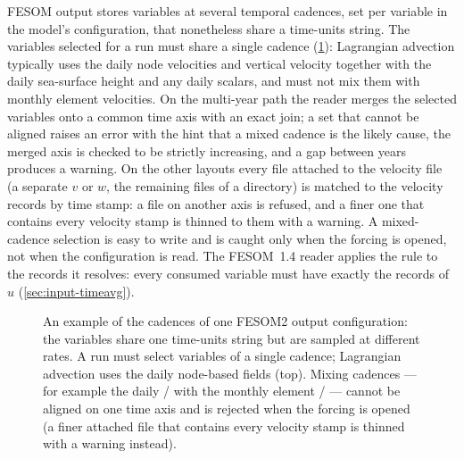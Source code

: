 FESOM output stores variables at several temporal cadences, set per variable in the model's configuration,
that nonetheless share a time-units string. The variables selected for a run must share a single cadence
(\cref{fig:cadence}): Lagrangian advection typically uses the daily node velocities and vertical velocity
together with the daily sea-surface height and any daily scalars, and must not mix them with monthly
element velocities. On the multi-year path the reader merges the selected variables onto a common time axis
with an exact join; a set that cannot be aligned raises an error with the hint that a mixed cadence is the
likely cause, the merged axis is checked to be strictly increasing, and a gap between years produces a
warning. On the other layouts every file attached to the velocity file (a separate $v$ or $w$, the
remaining files of a directory) is matched to the velocity records by time stamp: a file on another axis is
refused, and a finer one that contains every velocity stamp is thinned to them with a warning. A
mixed-cadence selection is easy to write and is caught only when the forcing is opened, not when the
configuration is read. The FESOM~1.4 reader applies the rule to the records it resolves: every consumed
variable must have exactly the records of $u$ (\cref{sec:input-timeavg}).

\begin{figure}[t]
\centering
{}
\caption{An example of the cadences of one FESOM2 output configuration: the variables share one time-units
string but are sampled at different rates. A run must select variables of a single cadence; Lagrangian
advection uses the daily node-based fields (top). Mixing cadences --- for example the daily
/ with the monthly element / --- cannot be aligned on one time axis and
is rejected when the forcing is opened (a finer attached file that contains every velocity stamp is thinned
with a warning instead).}
\label{fig:cadence}
\end{figure}

